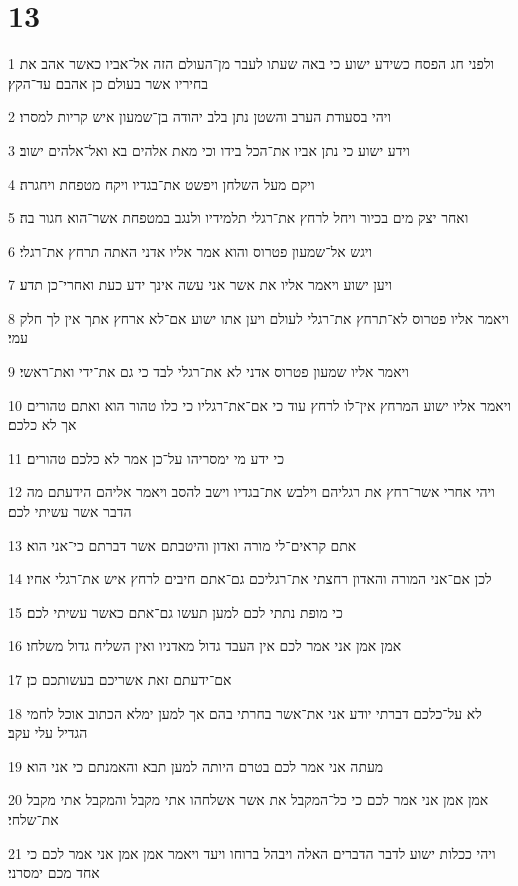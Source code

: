 \chapter{13}

\par 1 ולפני חג הפסח כשידע ישוע כי באה שעתו לעבר מן־העולם הזה אל־אביו כאשר אהב את בחיריו אשר בעולם כן אהבם עד־הקץ׃
\par 2 ויהי בסעודת הערב והשטן נתן בלב יהודה בן־שמעון איש קריות למסרו׃
\par 3 וידע ישוע כי נתן אביו את־הכל בידו וכי מאת אלהים בא ואל־אלהים ישוב׃
\par 4 ויקם מעל השלחן ויפשט את־בגדיו ויקח מטפחת ויחגרה׃
\par 5 ואחר יצק מים בכיור ויחל לרחץ את־רגלי תלמידיו ולנגב במטפחת אשר־הוא חגור בה׃
\par 6 ויגש אל־שמעון פטרוס והוא אמר אליו אדני האתה תרחץ את־רגלי׃
\par 7 ויען ישוע ויאמר אליו את אשר אני עשה אינך ידע כעת ואחרי־כן תדע׃
\par 8 ויאמר אליו פטרוס לא־תרחץ את־רגלי לעולם ויען אתו ישוע אם־לא ארחץ אתך אין לך חלק עמי׃
\par 9 ויאמר אליו שמעון פטרוס אדני לא את־רגלי לבד כי גם את־ידי ואת־ראשי׃
\par 10 ויאמר אליו ישוע המרחץ אין־לו לרחץ עוד כי אם־את־רגליו כי כלו טהור הוא ואתם טהורים אך לא כלכם׃
\par 11 כי ידע מי ימסריהו על־כן אמר לא כלכם טהורים׃
\par 12 ויהי אחרי אשר־רחץ את רגליהם וילבש את־בגדיו וישב להסב ויאמר אליהם הידעתם מה הדבר אשר עשיתי לכם׃
\par 13 אתם קראים־לי מורה ואדון והיטבתם אשר דברתם כי־אני הוא׃
\par 14 לכן אם־אני המורה והאדון רחצתי את־רגליכם גם־אתם חיבים לרחץ איש את־רגלי אחיו׃
\par 15 כי מופת נתתי לכם למען תעשו גם־אתם כאשר עשיתי לכם׃
\par 16 אמן אמן אני אמר לכם אין העבד גדול מאדניו ואין השליח גדול משלחו׃
\par 17 אם־ידעתם זאת אשריכם בעשותכם כן׃
\par 18 לא על־כלכם דברתי יודע אני את־אשר בחרתי בהם אך למען ימלא הכתוב אוכל לחמי הגדיל עלי עקב׃
\par 19 מעתה אני אמר לכם בטרם היותה למען תבא והאמנתם כי אני הוא׃
\par 20 אמן אמן אני אמר לכם כי כל־המקבל את אשר אשלחהו אתי מקבל והמקבל אתי מקבל את־שלחי׃
\par 21 ויהי ככלות ישוע לדבר הדברים האלה ויבהל ברוחו ויעד ויאמר אמן אמן אני אמר לכם כי אחד מכם ימסרני׃
